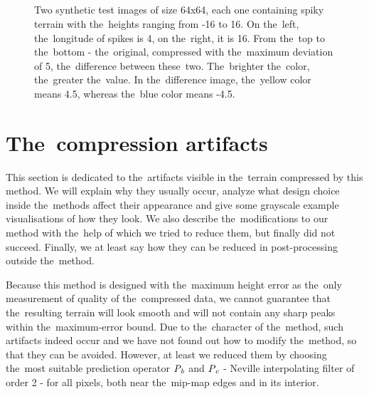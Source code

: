 \begin{figure}
	\\\\
	\\\\
	\caption{Two synthetic test images of size 64x64, each one containing spiky terrain with the~heights ranging from -16 to 16. On the~left, the~longitude of spikes is 4, on the~right, it is 16. From the~top to the~bottom - the~original, compressed with the~maximum deviation of 5, the~difference between these~two. The~brighter the~color, the~greater the~value. In the~difference image, the~yellow color means 4.5, whereas the~blue color means -4.5.}
	\label{fig:result_wave_samples}
\end{figure}

\section{The~compression artifacts}\label{sec:artifs}

This section is dedicated to the~artifacts visible in the~terrain compressed by this method. We will explain why they usually occur, analyze what design choice inside the~methods affect their appearance and give some grayscale example visualisations of how they look. We also describe the~modifications to our method with the~help of which we tried to reduce them, but finally did not succeed. Finally, we at least say how they can be reduced in post-processing outside the~method.

Because this method is designed with the~maximum height error as the~only measurement of quality of the~compressed data, we cannot guarantee that the~resulting terrain will look smooth and will not contain any sharp peaks within the~maximum-error bound. Due to the~character of the~method, such artifacts indeed occur and we have not found out how to modify the~method, so that they can be avoided. However, at least we reduced them by choosing the~most suitable prediction operator $\mathit{P_{b}}$ and $\mathit{P_{c}}$ - Neville interpolating filter of order 2 - for all pixels, both near the~mip-map edges and in its interior.

